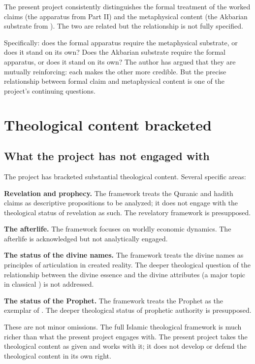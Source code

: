 The present project consistently distinguishes the formal
treatment of the worked claims (the apparatus from Part II) and
the metaphysical content (the Akbarian substrate from
). The two are related but the relationship is
not fully specified.

Specifically: does the formal apparatus require the metaphysical
substrate, or does it stand on its own? Does the Akbarian
substrate require the formal apparatus, or does it stand on its
own? The author has argued that they are mutually reinforcing:
each makes the other more credible. But the precise relationship
between formal claim and metaphysical content is one of the
project's continuing questions.

\section{Theological content bracketed}
\label{sec:open-theological}

\subsection{What the project has not engaged with}

The project has bracketed substantial theological content. Several
specific areas:

\textbf{Revelation and prophecy.} The framework treats the
Quranic and hadith claims as descriptive propositions to be
analyzed; it does not engage with the theological status of
revelation as such. The revelatory framework is presupposed.

\textbf{The afterlife.} The framework focuses on worldly economic
dynamics. The afterlife is acknowledged but not analytically
engaged.

\textbf{The status of the divine names.} The framework treats the
divine names as principles of articulation in created reality. The
deeper theological question of the relationship between the
divine essence and the divine attributes (a major topic in
classical ) is not addressed.

\textbf{The status of the Prophet.} The framework treats the
Prophet as the exemplar of . The deeper
theological status of prophetic authority is presupposed.

These are not minor omissions. The full Islamic theological
framework is much richer than what the present project engages
with. The present project takes the theological content as
given and works with it; it does not develop or defend the
theological content in its own right.

